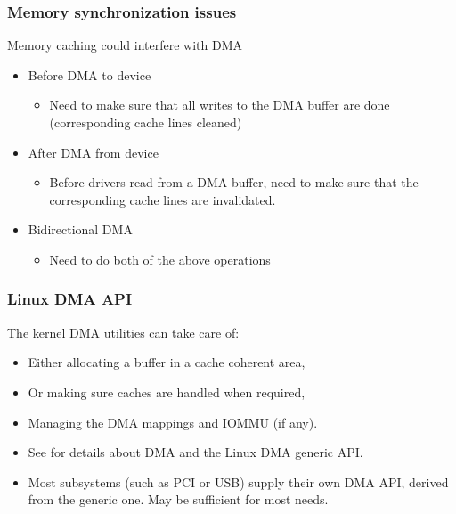 \begin{frame}
  \frametitle{Memory synchronization issues}
  Memory caching could interfere with DMA
  \begin{itemize}
  \item Before DMA to device
    \begin{itemize}
    \item Need to make sure that all writes to the DMA buffer are done
          (corresponding cache lines cleaned)
    \end{itemize}
  \item After DMA from device
    \begin{itemize}
    \item Before drivers read from a DMA buffer, need to make sure
      that the corresponding cache lines are invalidated.
    \end{itemize}
  \item Bidirectional DMA
    \begin{itemize}
    \item Need to do both of the above operations
    \end{itemize}
  \end{itemize}
\end{frame}

\begin{frame}
  \frametitle{Linux DMA API}
  The kernel DMA utilities can take care of:
  \begin{itemize}
  \item Either allocating a buffer in a cache coherent area,
  \item Or making sure caches are handled when required,
  \item Managing the DMA mappings and IOMMU (if any).
  \item See  for details about DMA
    and the Linux DMA generic API.
  \item Most subsystems (such as PCI or USB) supply their own DMA
    API, derived from the generic one. May be sufficient for most
    needs.
  \end{itemize}
\end{frame}

